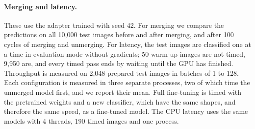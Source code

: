 \paragraph{Merging and latency.} These use the adapter trained with seed 42. For merging we compare the
predictions on all 10,000 test images before and after merging, and after 100 cycles of merging and unmerging. For
latency, the test images are classified one at a time in evaluation mode without gradients; 50 warm-up images are
not timed, 9,950 are, and every timed pass ends by waiting until the GPU has finished. Throughput is measured on
2,048 prepared test images in batches of 1 to 128. Each configuration is measured in three separate processes, two
of which time the unmerged model first, and we report their mean. Full fine-tuning is timed with the pretrained
weights and a new classifier, which have the same shapes, and therefore the same speed, as a fine-tuned model. The
CPU latency uses the same models with 4 threads, 190 timed images and one process.
